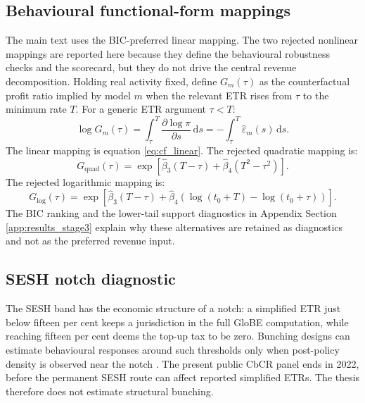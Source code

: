 \documentclass[11pt,a4paper]{article}
\begin{document}
\subsection{Behavioural functional-form mappings}\label{app:behavioural_details}

The main text uses the BIC-preferred linear mapping. The two rejected nonlinear mappings are reported here because they define the behavioural robustness checks and the scorecard, but they do not drive the central revenue decomposition. Holding real activity fixed, define $G_m(\tau)$ as the counterfactual profit ratio implied by model $m$ when the relevant ETR rises from $\tau$ to the minimum rate $T$. For a generic ETR argument $\tau<T$:
\begin{equation}\label{eq:cf_integral}
\log G_m(\tau) = \int_{\tau}^{T}\frac{\partial \log \pi}{\partial s}\,\mathrm{d}s = -\int_{\tau}^{T}\hat{\varepsilon}_m(s)\,\mathrm{d}s.
\end{equation}
The linear mapping is equation \eqref{eq:cf_linear}. The rejected quadratic mapping is:
\begin{equation}\label{eq:cf_quad}
G_{\text{quad}}(\tau) = \exp\!\left[\hat{\beta}_3(T-\tau) + \hat{\beta}_4(T^2-\tau^2)\right].
\end{equation}
The rejected logarithmic mapping is:
\begin{equation}\label{eq:cf_log}
G_{\text{log}}(\tau) = \exp\!\left[\hat{\beta}_3(T-\tau) + \hat{\beta}_4\left(\log(t_0+T)-\log(t_0+\tau)\right)\right].
\end{equation}
The BIC ranking and the lower-tail support diagnostics in Appendix Section \ref{app:results_stage3} explain why these alternatives are retained as diagnostics and not as the preferred revenue input.

\subsection{SESH notch diagnostic}\label{app:sesh_details}

The SESH band has the economic structure of a notch: a simplified ETR just below fifteen per cent keeps a jurisdiction in the full GloBE computation, while reaching fifteen per cent deems the top-up tax to be zero. Bunching designs can estimate behavioural responses around such thresholds only when post-policy density is observed near the notch \citep{saez2010,kleven2013,kleven2016}. The present public CbCR panel ends in 2022, before the permanent SESH route can affect reported simplified ETRs. The thesis therefore does not estimate structural bunching.
\end{document}
